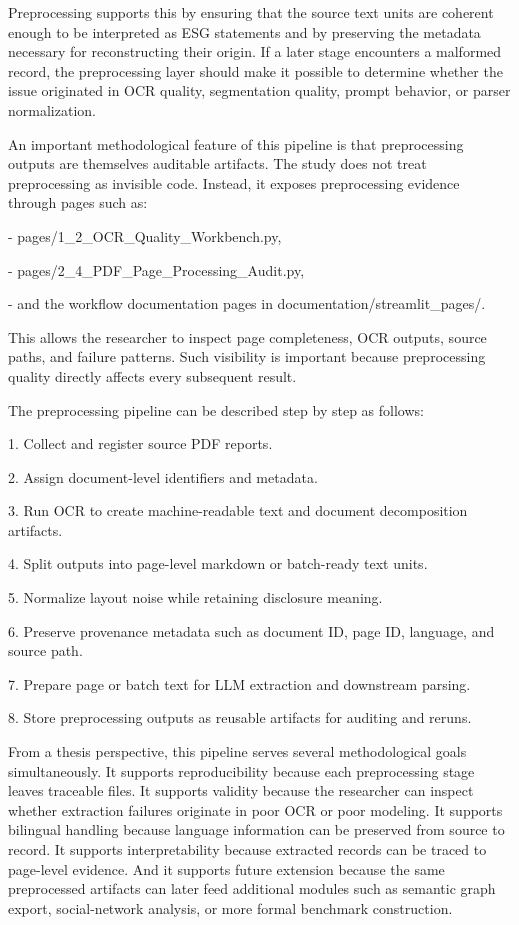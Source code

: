 \documentclass{article}
\begin{document}
Preprocessing supports this by ensuring that the source text units are coherent enough to be interpreted as ESG statements and by preserving the metadata necessary for reconstructing their origin. If a later stage encounters a malformed record, the preprocessing layer should make it possible to determine whether the issue originated in OCR quality, segmentation quality, prompt behavior, or parser normalization.

An important methodological feature of this pipeline is that preprocessing outputs are themselves auditable artifacts. The study does not treat preprocessing as invisible code. Instead, it exposes preprocessing evidence through pages such as:

- pages/1\_2\_OCR\_Quality\_Workbench.py,

- pages/2\_4\_PDF\_Page\_Processing\_Audit.py,

- and the workflow documentation pages in documentation/streamlit\_pages/.

This allows the researcher to inspect page completeness, OCR outputs, source paths, and failure patterns. Such visibility is important because preprocessing quality directly affects every subsequent result.

The preprocessing pipeline can be described step by step as follows:

1. Collect and register source PDF reports.

2. Assign document-level identifiers and metadata.

3. Run OCR to create machine-readable text and document decomposition artifacts.

4. Split outputs into page-level markdown or batch-ready text units.

5. Normalize layout noise while retaining disclosure meaning.

6. Preserve provenance metadata such as document ID, page ID, language, and source path.

7. Prepare page or batch text for LLM extraction and downstream parsing.

8. Store preprocessing outputs as reusable artifacts for auditing and reruns.

From a thesis perspective, this pipeline serves several methodological goals simultaneously. It supports reproducibility because each preprocessing stage leaves traceable files. It supports validity because the researcher can inspect whether extraction failures originate in poor OCR or poor modeling. It supports bilingual handling because language information can be preserved from source to record. It supports interpretability because extracted records can be traced to page-level evidence. And it supports future extension because the same preprocessed artifacts can later feed additional modules such as semantic graph export, social-network analysis, or more formal benchmark construction.
\end{document}
